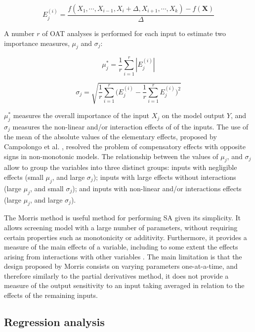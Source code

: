 \documentclass[12pt]{article}
\begin{document}
\begin{equation}
E^{(i)}_{j}=\frac{f(X_{1},\cdots,X_{i-1}, X_{i}+\Delta,X_{i+1},\cdots,X_{k})-f(\mathbf{X})}{\Delta}
\end{equation}

\vspace{0.5cm}
A number $r$ of OAT analyses is performed for each input to estimate two importance measures, $\mu_{j}$ and  $\sigma_{j}$:

\begin{equation}
\mu^{*}_{j}=\frac{1}{r}\sum^{r}_{i=1}|E^{(i)}_{j}|
\end{equation}

\begin{equation}
\sigma_{j}=\sqrt{\frac{1}{r}\sum^{r}_{i=1}\Big(E^{(i)}_{j}-\frac{1}{r}\sum^{r}_{i=1}E^{(i)}_{j}\Big)^{2}}
\end{equation}

\vspace{0.5cm}

$\mu^{*}_{j}$ measures the overall importance of the input $X_{j}$ on the model output $Y$, and $\sigma_{j}$ measures the non-linear and/or interaction effects of of the inputs. The use of the mean of the absolute values of the elementary effects, proposed by Campolongo et al. \cite{CAMPOLONGO20071509}, resolved the problem of compensatory effects with opposite signs in non-monotonic models. 
The relationship between the values of $\mu_{j}$, and  $\sigma_{j}$ allow to group the variables into three distinct groups: inputs with negligible effects (small $\mu_{j}$, and large $\sigma_{j}$); inputs with  large effects without interactions (large $\mu_{j}$, and small $\sigma_{j}$); and inputs with non-linear and/or interactions effects (large $\mu_{j}$, and large $\sigma_{j}$).

The Morris method is useful method for performing SA given its simplicity. It allows screening model with a large number of parameters, without requiring certain properties such as monotonicity or additivity. Furthermore, it provides a measure of the main effects of a variable, including to some extent the effects arising from interactions with other variables \cite{CAMPOLONGO20071509}. The main limitation is that the design proposed by Morris \cite{} consists on varying parameters one-at-a-time, and therefore similarly to the partial derivatives method, it does not provide a measure of the output sensitivity to an input taking averaged in relation to the effects of the remaining inputs.


\subsection{Regression analysis}
\end{document}
